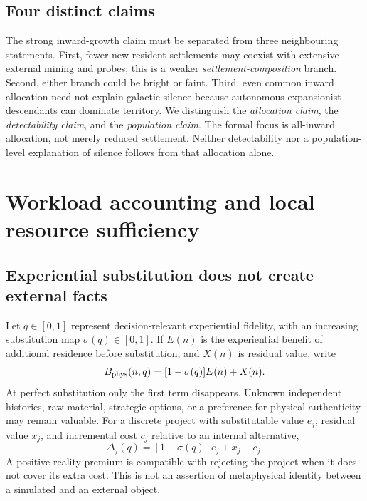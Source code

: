 \subsection{Four distinct claims}

The strong inward-growth claim must be separated from three neighbouring statements. First, fewer new resident settlements may coexist with extensive external mining and probes; this is a weaker \emph{settlement-composition} branch. Second, either branch could be bright or faint. Third, even common inward allocation need not explain galactic silence because autonomous expansionist descendants can dominate territory. We distinguish the \emph{allocation claim}, the \emph{detectability claim}, and the \emph{population claim}. The formal focus is all-inward allocation, not merely reduced settlement. Neither detectability nor a population-level explanation of silence follows from that allocation alone.

\section{Workload accounting and local resource sufficiency}
\label{sec:support}

\subsection{Experiential substitution does not create external facts}

Let $q\in[0,1]$ represent decision-relevant experiential fidelity, with an increasing substitution map $\sigma(q)\in[0,1]$. If $E(n)$ is the experiential benefit of additional residence before substitution, and $X(n)$ is residual value, write
\begin{equation}
 B_{\rm phys}(n,q)=[1-\sigma(q)]E(n)+X(n).
 \label{eq:experiential}
\end{equation}
At perfect substitution only the first term disappears. Unknown independent histories, raw material, strategic options, or a preference for physical authenticity may remain valuable. For a discrete project with substitutable value $e_j$, residual value $x_j$, and incremental cost $c_j$ relative to an internal alternative,
\begin{equation}
 \Delta_j(q)=[1-\sigma(q)]e_j+x_j-c_j.
 \label{eq:premium}
\end{equation}
A positive reality premium is compatible with rejecting the project when it does not cover its extra cost. This is not an assertion of metaphysical identity between a simulated and an external object.

